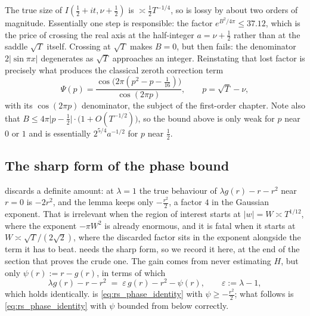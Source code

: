 \begin{remark}
\label{rem:rs_constant}
The true size of $I(\tfrac12+it,\nu+\tfrac12)$ is $\asymp\tfrac12T^{-1/4}$, so
 is lossy by about two orders of magnitude.  Essentially one
step is responsible: the factor $e^{B^{2}/4\pi}\le37.12$, which is the price of crossing the
real axis at the half-integer $a=\nu+\tfrac12$ rather than at the saddle $\sqrt T$
itself.  Crossing at $\sqrt T$ makes $B=0$, but then  fails:
the denominator $2\lvert\sin\pi x\rvert$ degenerates as $\sqrt T$ approaches an integer.
Reinstating that lost factor is precisely what produces the classical zeroth correction
term
\[
  \Psi(p)=\frac{\cos\bigl(2\pi(p^{2}-p-\tfrac1{16})\bigr)}{\cos(2\pi p)},\qquad p=\sqrt T-\nu,
\]
with its $\cos(2\pi p)$ denominator, the subject of the first-order chapter.  Note also that $B\le4\pi\lvert p-\tfrac12\rvert\cdot\bigl(1+O(T^{-1/2})\bigr)$,
so the bound above is only weak for $p$ near $0$ or $1$ and is essentially
$2^{5/4}a^{-1/2}$ for $p$ near $\tfrac12$.
\end{remark}

\subsection{The sharp form of the phase bound}
\label{sec:rs_phase_sharp}

 discards a definite amount: at $\lambda=1$ the true behaviour of
$\lambda g(r)-r-r^{2}$ near $r=0$ is $-2r^{2}$, and the lemma keeps only $-\tfrac{r^{2}}2$, a
factor $4$ in the Gaussian exponent.  That is irrelevant when the region of interest starts at
$\lvert w\rvert=W\asymp T^{1/12}$, where the exponent $-\pi W^{2}$ is already enormous, and it is
fatal when it starts at $W\asymp\sqrt T/(2\sqrt2)$, where the discarded factor sits in the
exponent alongside the term it has to beat.   needs the sharp form, so we
record it here, at the end of the section that proves the crude one.  The gain comes from never
estimating
$H$, but only $\psi(r):=r-g(r)$, in terms of which
\begin{equation}\label{eq:rs_phase_identity}
  \lambda g(r)-r-r^{2}\;=\;\varepsilon\,g(r)-r^{2}-\psi(r),\qquad\varepsilon:=\lambda-1,
\end{equation}
which holds identically.   is
\eqref{eq:rs_phase_identity} with $\psi\ge-\tfrac{r^{2}}2$; what follows is
\eqref{eq:rs_phase_identity} with $\psi$ bounded from below correctly.

